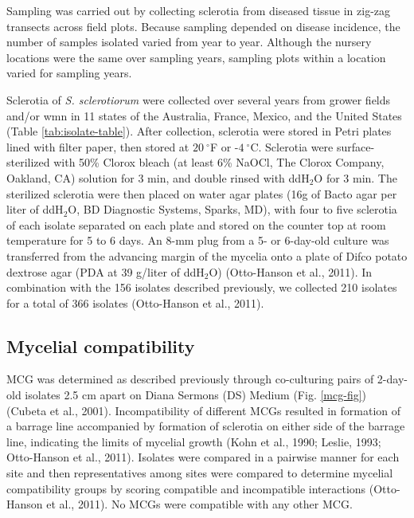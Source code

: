 Sampling was carried out by collecting sclerotia from diseased tissue in
zig-zag transects across field plots. Because sampling depended on
disease incidence, the number of samples isolated varied from year to
year. Although the nursery locations were the same over sampling years,
sampling plots within a location varied for sampling years.

Sclerotia of \emph{S. sclerotiorum} were collected over several years
from grower fields and/or wmn in 11 states of the Australia, France,
Mexico, and the United States (Table \ref{tab:isolate-table}). After
collection, sclerotia were stored in Petri plates lined with filter
paper, then stored at \(20~^{\circ}\)F or -\(4~^{\circ}\)C. Sclerotia
were surface-sterilized with 50\% Clorox bleach (at least 6\% NaOCl, The
Clorox Company, Oakland, CA) solution for 3 min, and double rinsed with
ddH\(_2\)O for 3 min. The sterilized sclerotia were then placed on water
agar plates (16g of Bacto agar per liter of ddH\(_2\)O, BD Diagnostic
Systems, Sparks, MD), with four to five sclerotia of each isolate
separated on each plate and stored on the counter top at room
temperature for 5 to 6 days. An 8-mm plug from a 5- or 6-day-old culture
was transferred from the advancing margin of the mycelia onto a plate of
Difco potato dextrose agar (PDA at 39 g/liter of ddH\(_2\)O)
(Otto-Hanson et al., 2011). In combination with the 156 isolates
described previously, we collected 210 isolates for a total of 366
isolates (Otto-Hanson et al., 2011).

\subsection*{Mycelial compatibility}\label{mycelial-compatibility}

MCG was determined as described previously through co-culturing pairs of
2-day-old isolates 2.5 cm apart on Diana Sermons (DS) Medium (Fig.
\ref{mcg-fig}) (Cubeta et al., 2001). Incompatibility of different MCGs
resulted in formation of a barrage line accompanied by formation of
sclerotia on either side of the barrage line, indicating the limits of
mycelial growth (Kohn et al., 1990; Leslie, 1993; Otto-Hanson et al.,
2011). Isolates were compared in a pairwise manner for each site and
then representatives among sites were compared to determine mycelial
compatibility groups by scoring compatible and incompatible interactions
(Otto-Hanson et al., 2011). No MCGs were compatible with any other MCG.

